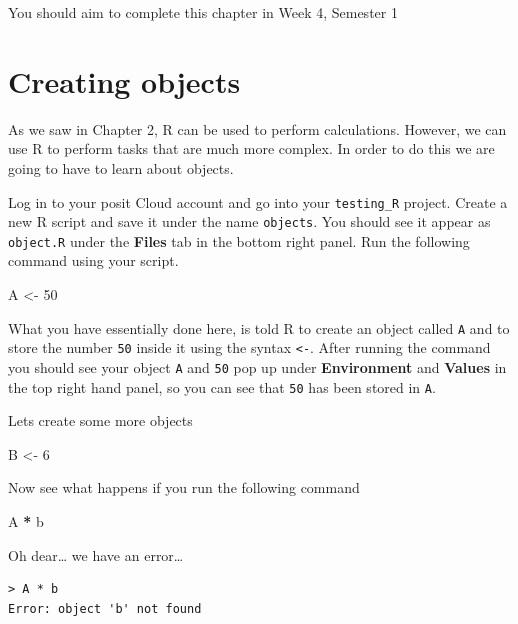 \documentclass[
]{book}
\newenvironment{Shaded}{\begin{snugshade}}{\end{snugshade}}
\newcommand{\DecValTok}[1]{\textcolor[rgb]{0.00,0.00,0.81}{#1}}
\newcommand{\NormalTok}[1]{#1}
\newcommand{\OtherTok}[1]{\textcolor[rgb]{0.56,0.35,0.01}{#1}}
\newcommand{\SpecialCharTok}[1]{\textcolor[rgb]{0.81,0.36,0.00}{\textbf{#1}}}
\begin{document}
You should aim to complete this chapter in Week 4, Semester 1

\section{Creating objects}\label{creating-objects}

As we saw in Chapter 2, R can be used to perform calculations. However, we can use R to perform tasks that are much more complex. In order to do this we are going to have to learn about objects.

Log in to your posit Cloud account and go into your \texttt{testing\_R} project. Create a new R script and save it under the name \texttt{objects}. You should see it appear as \texttt{object.R} under the \textbf{Files} tab in the bottom right panel. Run the following command using your script.

\begin{Shaded}
\begin{Highlighting}[]
\NormalTok{A }\OtherTok{\textless{}{-}} \DecValTok{50}
\end{Highlighting}
\end{Shaded}

What you have essentially done here, is told R to create an object called \texttt{A} and to store the number \texttt{50} inside it using the syntax \texttt{\textless{}-}. After running the command you should see your object \texttt{A} and \texttt{50} pop up under \textbf{Environment} and \textbf{Values} in the top right hand panel, so you can see that \texttt{50} has been stored in \texttt{A}.

Lets create some more objects

\begin{Shaded}
\begin{Highlighting}[]
\NormalTok{B }\OtherTok{\textless{}{-}} \DecValTok{6}
\end{Highlighting}
\end{Shaded}

Now see what happens if you run the following command

\begin{Shaded}
\begin{Highlighting}[]
\NormalTok{A }\SpecialCharTok{*}\NormalTok{ b}
\end{Highlighting}
\end{Shaded}

Oh dear\ldots{} we have an error\ldots{}

\begin{verbatim}
> A * b
Error: object 'b' not found
\end{verbatim}
\end{document}
